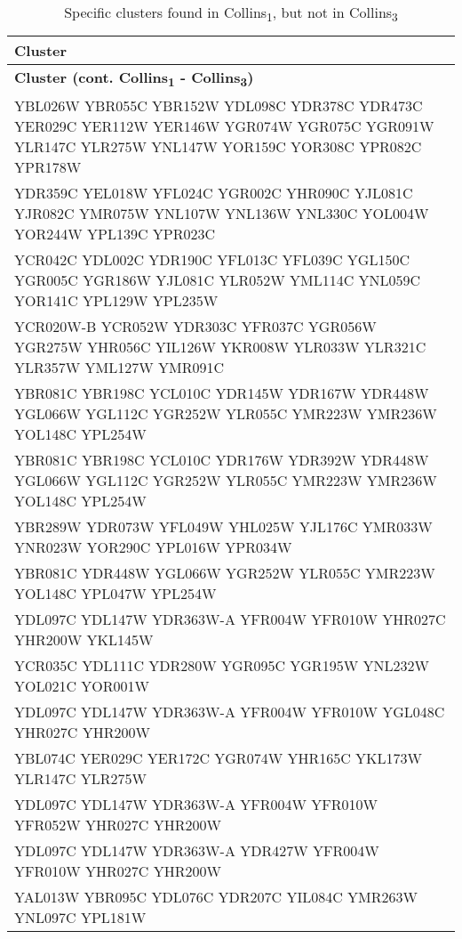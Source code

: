 \setlength{\extrarowheight}{2pt}
\renewcommand{\arraystretch}{1.2}
\begin{longtable}{| m{27em} |}
\caption{Specific clusters found in Collins\textsubscript{1}, but not in Collins\textsubscript{3}} \\
\hline
\textbf{Cluster} \\
\hline
\endfirsthead
\hline
\textbf{Cluster (cont. Collins\textsubscript{1} - Collins\textsubscript{3})} \\
\hline
\endhead
\hline
\endfoot
\hline
\endlastfoot
YBL026W YBR055C YBR152W YDL098C YDR378C YDR473C YER029C YER112W YER146W YGR074W YGR075C YGR091W YLR147C YLR275W YNL147W YOR159C YOR308C YPR082C YPR178W \\
\hline
YDR359C YEL018W YFL024C YGR002C YHR090C YJL081C YJR082C YMR075W YNL107W YNL136W YNL330C YOL004W YOR244W YPL139C YPR023C \\
\hline
YCR042C YDL002C YDR190C YFL013C YFL039C YGL150C YGR005C YGR186W YJL081C YLR052W YML114C YNL059C YOR141C YPL129W YPL235W \\
\hline
YCR020W-B YCR052W YDR303C YFR037C YGR056W YGR275W YHR056C YIL126W YKR008W YLR033W YLR321C YLR357W YML127W YMR091C \\
\hline
YBR081C YBR198C YCL010C YDR145W YDR167W YDR448W YGL066W YGL112C YGR252W YLR055C YMR223W YMR236W YOL148C YPL254W \\
\hline
YBR081C YBR198C YCL010C YDR176W YDR392W YDR448W YGL066W YGL112C YGR252W YLR055C YMR223W YMR236W YOL148C YPL254W \\
\hline
YBR289W YDR073W YFL049W YHL025W YJL176C YMR033W YNR023W YOR290C YPL016W YPR034W \\
\hline
YBR081C YDR448W YGL066W YGR252W YLR055C YMR223W YOL148C YPL047W YPL254W \\
\hline
YDL097C YDL147W YDR363W-A YFR004W YFR010W YHR027C YHR200W YKL145W \\
\hline
YCR035C YDL111C YDR280W YGR095C YGR195W YNL232W YOL021C YOR001W \\
\hline
YDL097C YDL147W YDR363W-A YFR004W YFR010W YGL048C YHR027C YHR200W \\
\hline
YBL074C YER029C YER172C YGR074W YHR165C YKL173W YLR147C YLR275W \\
\hline
YDL097C YDL147W YDR363W-A YFR004W YFR010W YFR052W YHR027C YHR200W \\
\hline
YDL097C YDL147W YDR363W-A YDR427W YFR004W YFR010W YHR027C YHR200W \\
\hline
YAL013W YBR095C YDL076C YDR207C YIL084C YMR263W YNL097C YPL181W \\

\end{longtable}

